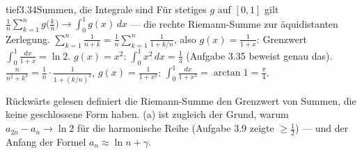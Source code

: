 \begin{loesungkarte}{tief}{3.34}{Summen, die Integrale sind}
Für stetiges $g$ auf $[0, 1]$ gilt $\frac1n\sum_{k=1}^{n}g\bigl(\frac kn\bigr)\to\int_0^1g(x)\,dx$ --- die rechte Riemann-Summe zur äquidistanten Zerlegung.
$\sum_{k=1}^{n}\frac1{n + k} = \frac1n\sum_{k=1}^{n}\frac1{1 + k/n}$, also $g(x) = \frac1{1 + x}$: Grenzwert $\int_0^1\frac{dx}{1 + x} = \ln2$.
$g(x) = x^{2}$: $\int_0^1x^{2}\,dx = \frac13$ (Aufgabe 3.35 beweist genau das).
$\frac n{n^{2} + k^{2}} = \frac1n\cdot\frac1{1 + (k/n)^{2}}$, $g(x) = \frac1{1 + x^{2}}$: $\int_0^1\frac{dx}{1 + x^{2}} = \arctan1 = \frac\pi4$.
\begin{mitnehmen}\kastentext
Rückwärts gelesen definiert die Riemann-Summe den Grenzwert von Summen, die keine geschlossene Form haben. (a) ist zugleich der Grund, warum $a_{2n} - a_n\to\ln2$ für die harmonische Reihe (Aufgabe 3.9 zeigte $\ge\frac12$) --- und der Anfang der Formel $a_n\approx\ln n + \gamma$.
\end{mitnehmen}
\end{loesungkarte}

